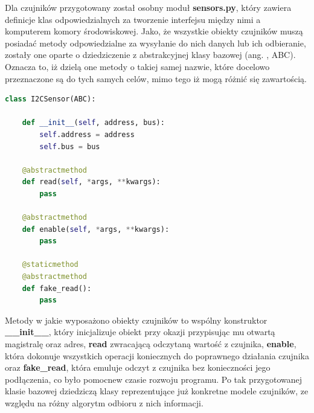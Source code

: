 Dla czujników przygotowany został osobny moduł \textbf{sensors.py}, który zawiera definicje klas odpowiedzialnych za tworzenie interfejsu między nimi a komputerem komory środowiskowej. Jako, że wszystkie obiekty czujników muszą posiadać metody odpowiedzialne za wysyłanie do nich danych lub ich odbieranie, zostały one oparte o dziedziczenie z abstrakcyjnej klasy bazowej (ang. , ABC). Oznacza to, iż dzielą one metody o takiej samej nazwie, które docelowo przeznaczone są do tych samych celów, mimo tego iż mogą różnić się zawartością.
\begin{lstlisting}[language=Python, caption={Abstrakcyjna klasa bazowa czujników.}]
class I2CSensor(ABC):

	def __init__(self, address, bus):
		self.address = address
		self.bus = bus
	
	@abstractmethod
	def read(self, *args, **kwargs):
		pass
	
	@abstractmethod
	def enable(self, *args, **kwargs):
		pass
	
	@staticmethod
	@abstractmethod
	def fake_read():
		pass	
\end{lstlisting}
Metody w jakie wyposażono obiekty czujników to wspólny konstruktor \textbf{\_\_init\_\_}, który inicjalizuje obiekt przy okazji przypisując mu otwartą magistralę oraz adres, \textbf{read} zwracającą odczytaną wartość z czujnika, \textbf{enable}, która dokonuje wszystkich operacji koniecznych do poprawnego działania czujnika oraz \textbf{fake\_read}, która emuluje odczyt z czujnika bez konieczności jego podłączenia, co było pomocne\linebreak w czasie rozwoju programu. Po tak przygotowanej klasie bazowej dziedziczą klasy reprezentujące już konkretne modele czujników, ze względu na różny algorytm odbioru z nich informacji.
